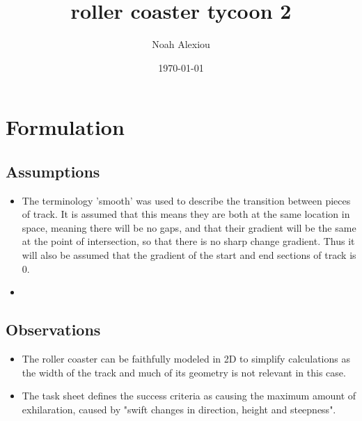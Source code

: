 \documentclass[11pt, letterpaper]{article}
\begin{document}
\begin{titlepage}
	\title{roller coaster tycoon 2}
	\author{Noah Alexiou}
	\date{\today}
	
	\maketitle
	\centering

	
\end{titlepage}


\newpage
\tableofcontents


\newpage


\section{Formulation}
\subsection{Assumptions}
\begin{itemize}
	\item The terminology 'smooth' was used to describe the transition between pieces of track. It is assumed that this means they are both at the same location in space, meaning there will be no gaps, and that their gradient will be the same at the point of intersection, so that there is no sharp change gradient. Thus it will also be assumed that the gradient of the start and end sections of track is 0.
	\item 
\end{itemize}




\subsection{Observations}
\begin{itemize}
	\item The roller coaster can be faithfully modeled in 2D to simplify calculations as the width of the track and much of its geometry is not relevant in this case. 
	\item The task sheet defines the success criteria as causing the maximum amount of exhilaration, caused by "swift changes in direction, height and steepness". 
\end{itemize}
\end{document}
